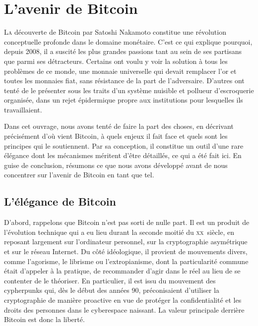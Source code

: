 
\chapter{L'avenir de Bitcoin} %
\label{ch:avenir}
\label{enotezch:15}


\lettrine[]{L}a découverte de Bitcoin par Satoshi Nakamoto constitue une révolution conceptuelle profonde dans le domaine monétaire. C'est ce qui explique pourquoi, depuis 2008, il a suscité les plus grandes passions tant au sein de ses partisans que parmi ses détracteurs. Certains ont voulu y voir la solution à tous les problèmes de ce monde, une monnaie universelle qui devait remplacer l'or et toutes les monnaies fiat, sans résistance de la part de l'adversaire. D'autres ont tenté de le présenter sous les traits d'un système nuisible et pollueur d'escroquerie organisée, dans un rejet épidermique propre aux institutions pour lesquelles ils travaillaient.

Dans cet ouvrage, nous avons tenté de faire la part des choses, en décrivant précisément d'où vient Bitcoin, à quels enjeux il fait face et quels sont les principes qui le soutiennent. Par sa conception, il constitue un outil d'une rare élégance dont les mécanismes méritent d'être détaillés, ce qui a été fait ici. En guise de conclusion, résumons ce que nous avons développé avant de nous concentrer sur l'avenir de Bitcoin en tant que tel. %

\vspace{-1em}
\section*{L'élégance de Bitcoin}


D'abord, rappelons que Bitcoin n'est pas sorti de nulle part. Il est un produit de l'évolution technique qui a eu lieu durant la seconde moitié du \textsc{xx}\ieme{}~siècle, en reposant largement sur l'ordinateur personnel, sur la cryptographie asymétrique et sur le réseau Internet. Du côté idéologique, il provient de mouvements divers, comme l'agorisme, le librisme ou l'extropianisme, dont la particularité commune était d'appeler à la pratique, de recommander d'agir dans le réel au lieu de se contenter de le théoriser. En particulier, il est issu du mouvement des cypherpunks qui, dès le début des années 90, préconisaient d'utiliser la cryptographie de manière proactive en vue de protéger la confidentialité et les droits des personnes dans le cyberespace naissant. La valeur principale derrière Bitcoin est donc la liberté.

